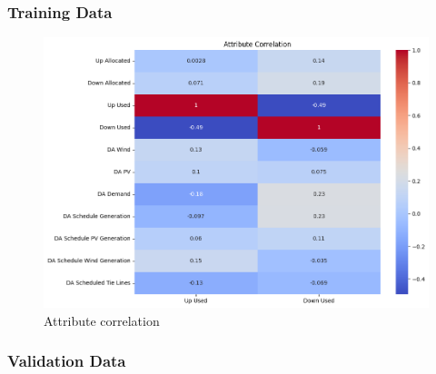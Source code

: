 \subsubsection{Training Data}





\begin{figure}[H]
    \centering
    \includegraphics[width=\textwidth]{plots/correlation_heatmap.png}
    \caption{Attribute correlation}
    \label{fig:Attribute_correlation}
  \end{figure}
  \unskip
  
  
  

\subsubsection{Validation Data}



% 



